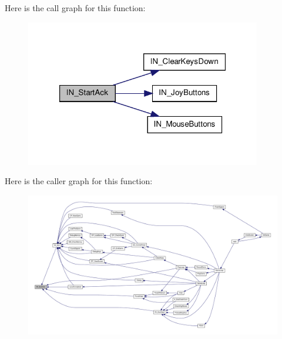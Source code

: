 Here is the call graph for this function:
\nopagebreak
\begin{figure}[H]
\begin{center}
\leavevmode
\includegraphics[width=292pt]{ID__IN_8H_ac666b84a87364ddab589ceb0daaa129a_cgraph}
\end{center}
\end{figure}




Here is the caller graph for this function:
\nopagebreak
\begin{figure}[H]
\begin{center}
\leavevmode
\includegraphics[width=400pt]{ID__IN_8H_ac666b84a87364ddab589ceb0daaa129a_icgraph}
\end{center}
\end{figure}


